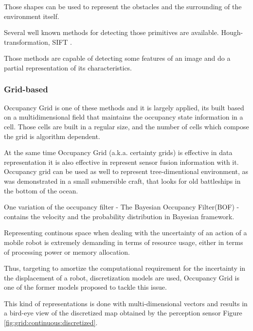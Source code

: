 Those shapes can be used to represent the obstacles and the surrounding of the environment itself.

Several well known methods for detecting those primitives are available. Hough-transformation, SIFT .

Those methods are capable of detecting some features of an image and do a partial representation of its characteristics.

\subsubsection{Grid-based}

Occupancy Grid is one of these methods and it is largely applied, its built based on a multidimensional field that maintains the occupancy state information in a cell\cite{Elfes:1989:UOG:68491.68495}. Those cells are built in a regular size, and the number of cells which compose the grid is algorithm dependent.

At the same time Occupancy Grid (a.k.a. certainty grids) is effective in data representation it is also effective in represent sensor fusion information with it. Occupancy grid can be used as well to represent tree-dimentional environment, as was demonstrated in a small submersible craft, that looks for old battleships in the bottom of the ocean\cite{DBLP:journals/aim/Moravec88}.

One variation of the occupancy filter - The Bayesian Occupancy Filter(BOF) - contains the velocity and the probability distribution in Bayesian framework.

Representing continous space when dealing with the uncertainty of an action of a mobile robot is extremely demanding in terms of resource usage, either in terms of processing power or memory allocation.

Thus, targeting to amortize the computational requirement for the incertainty in the displacement of a robot, discretization models are used, Occupancy Grid\cite{Elfes:1989:UOG:68491.68495} is one of the former models proposed to tackle this issue.

This kind of representations is done with multi-dimensional vectors and results in a bird-eye view of the discretized map obtained by the perception sensor Figure \ref{fig:grid:continuous:discretized}.


